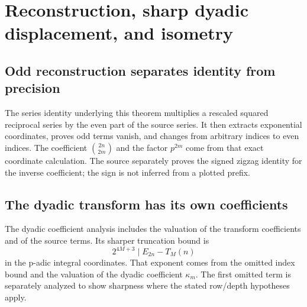 \section{Reconstruction, sharp dyadic displacement, and isometry}\label{sec:dyadic}
\subsection{Odd reconstruction separates identity from precision}
The series identity underlying this theorem multiplies a rescaled squared reciprocal series by the even part of the source series. It then extracts exponential coordinates, proves odd terms vanish, and changes from arbitrary indices to even indices. The coefficient $\binom{2n}{2m}$ and the factor $p^{2m}$ come from that exact coordinate calculation. The source separately proves the signed zigzag identity for the inverse coefficient; the sign is not inferred from a plotted prefix.


\subsection{The dyadic transform has its own coefficients}
The dyadic coefficient analysis includes the valuation of the transform coefficients and of the source terms. Its sharper truncation bound is
\[
2^{4M+3}\mid E_{2n}-T_M(n)
\]
in the p-adic integral coordinates. That exponent comes from the omitted index bound and the valuation of the dyadic coefficient $\kappa_m$. The first omitted term is separately analyzed to show sharpness where the stated row/depth hypotheses apply.


